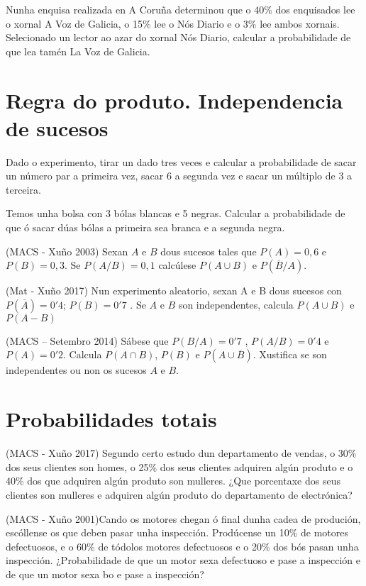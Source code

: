 \Exercicio  Nunha enquisa realizada en A Coruña determinou que o 40\% dos enquisados lee o xornal A Voz de Galicia, o 15\% lee o Nós Diario e o 3\% lee ambos xornais. Selecionado un lector ao azar do xornal Nós Diario, calcular a probabilidade de que lea tamén La Voz de Galicia.

\section{Regra do produto. Independencia de sucesos}

\Exercicio Dado o experimento, tirar un dado tres veces e calcular a probabilidade de sacar un número par a primeira vez, sacar 6 a segunda vez e sacar un múltiplo de 3 a terceira.

\Exercicio Temos unha bolsa con 3 bólas blancas e 5 negras. Calcular a probabilidade de que ó sacar dúas bólas a primeira sea branca e a segunda negra.

\Exercicio  (MACS - Xuño 2003) Sexan $A$ e $B$ dous sucesos tales que $P(A)=0,6$ e $P(B)=0,3$. Se $P(A/B)=0,1$ calcúlese $P(A \cup B)$ e $P( \overline{B}/ A )$.

\Exercicio  (Mat - Xuño 2017) Nun experimento aleatorio, sexan A e B dous sucesos con $P(\overline{A})=0'4$; $P(B)=0'7$ . Se $A$ e $B$ son independentes, calcula $P(A \cup B)$ e $P(A-B)$

\Exercicio  (MACS – Setembro 2014) Sábese que $P(B/A)=0'7$ , $P(A/B)=0'4$ e $P(A)=0'2$. Calcula $P( A \cap B)$, $P( B)$ e $P(A \cup \overline{B})$. Xustifica se son independentes ou non os sucesos $A$ e $B$.

\section{Probabilidades totais}

\Exercicio  (MACS - Xuño 2017) Segundo certo estudo dun departamento de vendas, o 30\% dos seus clientes son homes, o 25\% dos seus clientes  adquiren  algún produto e o 40\% dos que  adquiren  algún produto son mulleres. ¿Que porcentaxe dos seus clientes son mulleres e adquiren algún produto do departamento de electrónica? 

\Exercicio  (MACS - Xuño 2001)Cando os motores chegan ó final dunha cadea de produción, escóllense os que deben pasar unha inspección. Prodúcense un 10\% de motores defectuosos, e o 60\% de tódolos motores defectuosos e o 20\% dos bós pasan unha inspección. ¿Probabilidade de que un motor sexa defectuoso e pase a inspección e de que un motor sexa bo e pase a inspección?



